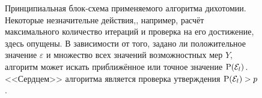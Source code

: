 \begin{figure}[h!]
\caption{\small Принципиальная блок-схема применяемого алгоритма дихотомии. Некоторые незначительне действия,, например, расчёт максимального количество итераций и проверка на его достижение, здесь опущены. В зависимости от того, задано ли положительное значение $\varepsilon$ и множество всех значений возможностных мер $Y$, алгоритм может искать приближённое или точное значение ${\mathrm{P}}(\mathcal{E}_l)$. <<Сердцем>> алгоритма является проверка утверждения ${\mathrm{P}}(\mathcal{E}_l) > p$. }
\label{ris:algo_scheme}
\end{figure}

